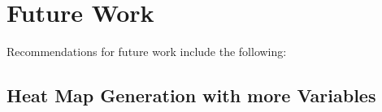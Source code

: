 \section{Future Work}
Recommendations for future work include the following:

\subsection{Heat Map Generation with more Variables}
